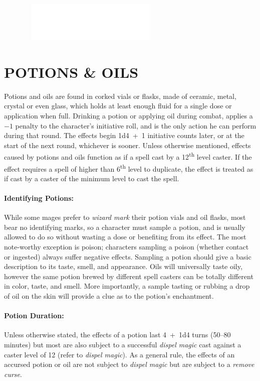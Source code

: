 \begin{multicols}{2}
\begin{minipage}{\columnwidth}
\end{minipage}

\noindent\includegraphics[width=3.6in, height=0.75in]{testblock.pdf}

\section{POTIONS \& OILS}

Potions and oils are found in corked vials or flasks, made of ceramic, metal, crystal or even glass, which holds at least enough fluid for a single dose or application when full.  Drinking a potion or applying oil during combat, applies a $-1$ penalty to the character's initiative roll, and is the only action he can perform during that round.  The effects begin 1d4~+~1 initiative counts later, or at the start of the next round, whichever is sooner.  Unless otherwise mentioned, effects caused by potions and oils function as if a spell cast by a 12\textsuperscript{th} level caster.  If the effect requires a spell of higher than 6\textsuperscript{th} level to duplicate, the effect is treated as if cast by a caster of the minimum level to cast the spell.

\paragraph{Identifying Potions:} While some mages prefer to \textit{wizard mark} their potion vials and oil flasks, most bear no identifying marks, so a character must sample a potion, and is usually allowed to do so without wasting a dose or benefiting from its effect.  The most note-worthy exception is poison; characters sampling a poison (whether contact or ingested) always suffer negative effects.  Sampling a potion should give a basic description to its taste, smell, and appearance.  Oils will universally taste oily, however the same potion brewed by different spell casters can be totally different in color, taste, and smell.  More importantly, a sample tasting or rubbing a drop of oil on the skin will provide a clue as to the potion's enchantment.
 
\paragraph{Potion Duration:} Unless otherwise stated, the effects of a potion last 4~+~1d4 turns (50--80 minutes) but most are also subject to a successful \textit{dispel magic} cast against a caster level of 12 (refer to \textit{dispel magic}).  As a general rule, the effects of an accursed potion or oil are not subject to \textit{dispel magic} but are subject to a \textit{remove curse}.


\end{multicols}
